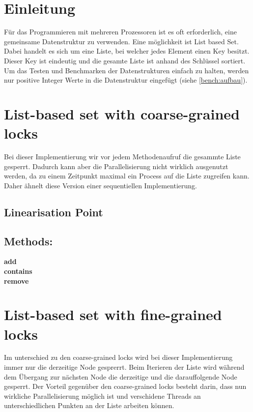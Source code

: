 \documentclass[10pt,a4paper,titlepage,oneside]{article}
\begin{document}
 

\maketitle  
 
\tableofcontents
\newpage  
\section{Einleitung}
Für das Programmieren mit mehreren Prozessoren ist es oft erforderlich, eine gemeinsame Datenstruktur zu verwenden. 
Eine möglichkeit ist List based Set. Dabei handelt es sich um eine Liste, bei welcher jedes Element einen Key besitzt.
Dieser Key ist eindeutig und die gesamte Liste ist anhand des Schlüssel sortiert. 
Um das Testen und Benchmarken der Datenstrukturen einfach zu halten, werden nur positive Integer Werte in die Datenstruktur eingefügt (siehe \ref{bench:aufbau}).

\section{List-based set with coarse-grained locks}

Bei dieser Implementierung wir vor jedem Methodenaufruf die gesammte Liste gesperrt. Dadurch kann aber die Parallelisierung nicht wirklich ausgenutzt werden, da zu einem Zeitpunkt maximal ein Process auf die Liste zugreifen kann. Daher ähnelt diese Version einer sequentiellen Implementierung.

\subsection{Linearisation Point}

\subsection{Methods:}
\textbf{add}\\
\textbf{contains}\\
\textbf{remove}

\section{List-based set with fine-grained locks}

Im unterschied zu den coarse-grained locks wird bei dieser Implementierung immer nur die derzeitige Node gesprerrt. Beim Iterieren der Liste wird während dem Übergang zur nächsten Node die derzeitige und die darauffolgende Node gesperrt. Der Vorteil gegenüber den coarse-grained locks besteht darin, dass nun wirkliche Parallelisierung möglich ist und verschidene Threads an unterschiedlichen Punkten an der Liste arbeiten können.
\end{document}
